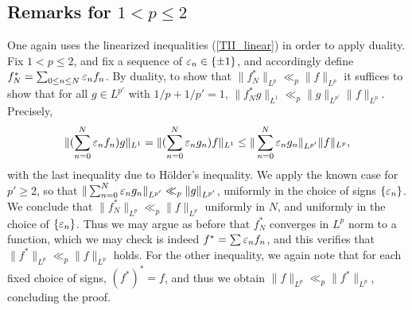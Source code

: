 \documentclass[oneside,11pt]{amsart}
\begin{document}
 \subsection{Remarks for $1< p  \leq 2$}\label{sec_linear}
One again uses the linearized inequalities (\ref{TII_linear}) in order to apply duality. 
Fix $1<p \leq 2$, and fix a sequence of $\varepsilon_n \in \{\pm 1\}$, and accordingly define $f_N^* = \sum_{0 \leq n  \leq N} \varepsilon_n f_n$. By duality, to show that $\| f_N^*\|_{L^p} \ll_p \|f\|_{L^p}$ it suffices to show that for all $g \in L^{p'}$ with  $1/p + 1/p'=1$, 
$\| f_N^* g\|_{L^1} \ll_p \|g\|_{L^{p'}} \|f\|_{L^p}.$
Precisely, 
\[ \| (\sum_{n=0}^{N} \varepsilon_n f_n)  g \|_{L^1} = \| (\sum_{n=0}^{N} \varepsilon_n g_n) f \|_{L^1} 
\leq \| \sum_{n=0}^{N} \varepsilon_n g_n\|_{L^{p'}} \| f\|_{L^p},
\]
with the last inequality due to  H\"older's inequality.
We apply   the known case for  $p' \geq 2$, so that  $\| \sum_{n=0}^{N} \varepsilon_n g_n\|_{L^{p'}}\ll_p \|g\|_{L^{p'}}$, uniformly in the choice of signs $\{ \varepsilon_n\}$. We conclude that $\| f_N^*\|_{L^p} \ll_p \|f\|_{L^p}$ uniformly in $N$, and uniformly in the choice of $\{\varepsilon_n\}$. Thus we may argue as before that $f_N^*$ converges in $L^p$ norm to a function, which we may check is indeed $f^* = \sum \varepsilon_n f_n$, and this verifies that $\| f^*\|_{L^p} \ll_p \|f\|_{L^p}$ holds. For the other inequality, we again note that for each fixed choice of signs, $(f^*)^*=f$,  and thus we obtain $\| f\|_{L^p} \ll_p \|f^*\|_{L^p}$, concluding the proof. 
\end{document}

